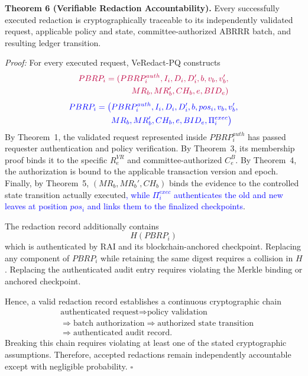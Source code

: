 \documentclass[lettersize,journal]{IEEEtran}
\begin{document}
\textbf{Theorem 6 (Verifiable Redaction Accountability).}
Every successfully executed redaction is cryptographically traceable
to its independently validated request, applicable policy and state,
committee-authorized ABRRR batch, and resulting ledger transition.

\emph{Proof:}
For every executed request, VeRedact-PQ constructs
\begin{equation}
{\color{purple}
\begin{split}
PBRP_i = (PBRP_i^{auth},I_i,D_i,D_i',
b,v_b,v_b',\\MR_b,MR_b',CH_b,e,BID_e)
\end{split}}
\end{equation}
\begin{equation}
{\color{blue}
\begin{aligned}
PBRP_i=\big(&PBRP_i^{auth},I_i,D_i,D_i',b,pos_i,v_b,v_b',\\
&MR_b,MR_b',CH_b,e,BID_e,\Pi_i^{exec}\big)
\end{aligned}}
\label{eq:sec_pbrp}
\end{equation}
By Theorem~1, the validated request represented inside
$PBRP_i^{auth}$ has passed requester authentication and policy
verification. By Theorem~3, its membership proof binds it to the
specific $R_e^{VR}$ and committee-authorized $C_e^B$. By
Theorem~4, the authorization is bound to the applicable transaction
version and epoch. Finally, by Theorem~5, $(MR_b,MR_b',CH_b)$ binds
the evidence to the controlled state transition actually executed\textcolor{blue}{,
while $\Pi_i^{exec}$ authenticates the old and new leaves at position
$pos_i$ and links them to the finalized checkpoints}.

The redaction record additionally contains
\begin{equation}
H(PBRP_i)
\label{eq:sec_pbrp_hash}
\end{equation}
which is authenticated by RAI and its blockchain-anchored checkpoint.
Replacing any component of $PBRP_i$ while retaining the same digest
requires a collision in $H$. Replacing the authenticated audit entry
requires violating the Merkle binding or anchored checkpoint.

Hence, a valid redaction record establishes a continuous
cryptographic chain
\begin{equation}
\begin{split}
&\text{authenticated request}
\Rightarrow \text{policy validation}\\
&\Rightarrow \text{batch authorization}
\Rightarrow \text{authorized state transition}\\
&\Rightarrow \text{authenticated audit record}.
\end{split}
\label{eq:sec_accountability_chain}
\end{equation}
Breaking this chain requires violating at least one of the stated
cryptographic assumptions. Therefore, accepted redactions remain
independently accountable except with negligible probability.
\hfill$\square$
\end{document}
